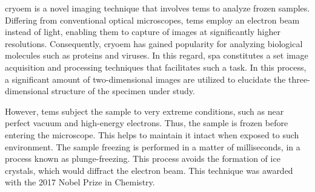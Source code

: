 \documentclass[../main.tex]{subfiles}
\begin{document}
\Gls{cryoem} is a novel imaging technique that involves \glspl{tem} to analyze frozen samples. Differing from conventional optical microscopes, \glspl{tem} employ an electron beam instead of light, enabling them to capture of images at significantly higher resolutions. Consequently, \gls{cryoem} has gained popularity for analyzing biological molecules such as proteins and viruses\cite{chemistry_world_cryoem}. In this regard, \gls{spa} constitutes a set image acquisition and processing techniques that facilitates such a task. In this process, a significant amount of two-dimensional images are utilized to elucidate the three-dimensional structure of the specimen under study.

However, \glspl{tem} subject the sample to very extreme conditions, such as near perfect vacuum and high-energy electrons. Thus, the sample is frozen before entering the microscope. This helps to maintain it intact when exposed to such environment. The sample freezing is performed in a matter of milliseconds, in a process known as plunge-freezing. This process avoids the formation of ice crystals, which would diffract the electron beam. This technique was awarded with the 2017 Nobel Prize in Chemistry\cite{chemistry_world_cryoem}\cite{nobel2017}.

\end{document}
